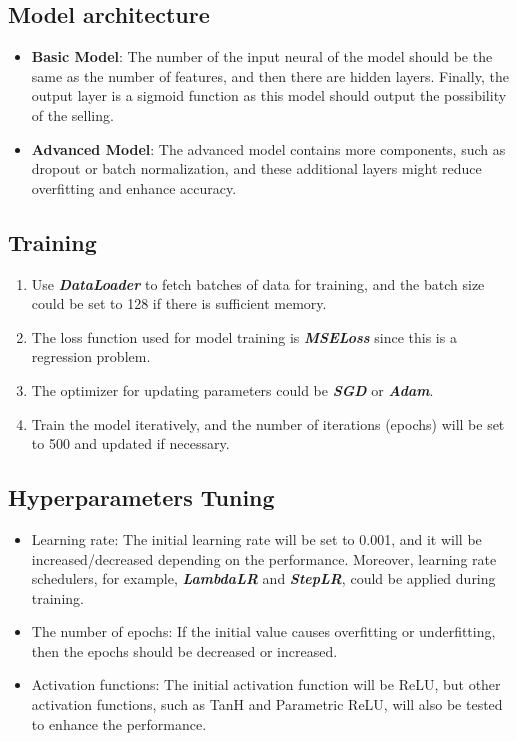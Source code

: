 \documentclass[12pt,twoside]{report}
\begin{document}
\subsection{Model architecture}
\begin{itemize}
	\item \textbf{Basic Model}: The number of the input neural of the model should be the same as the number of features, and then there are hidden layers. Finally, the output layer is a sigmoid function as this model should output the possibility of the selling. 
	\item \textbf{Advanced Model}: The advanced model contains more components, such as dropout or batch normalization, and these additional layers might reduce overfitting and enhance accuracy. 
\end{itemize}

\subsection{Training}
\begin{enumerate}
	\item Use \textbf{\textit{DataLoader}} to fetch batches of data for training, and the batch  size could be set to 128 if there is sufficient memory. 
	\item The loss function used for model training is \textbf{\textit{MSELoss}} since this is a regression problem. 
	\item The optimizer for updating parameters could be \textbf{\textit{SGD}} or \textbf{\textit{Adam}}.
	\item Train the model iteratively, and the number of iterations (epochs) will be set to 500 and updated if necessary. 
\end{enumerate}

\subsection{Hyperparameters Tuning}
\begin{itemize}
	\item Learning rate: The initial learning rate will be set to 0.001, and it will be increased/decreased depending on the performance. Moreover, learning rate schedulers, for example, \textbf{\textit{LambdaLR}} and \textbf{\textit{StepLR}}, could be applied during training. 
	\item The number of epochs: If the initial value causes overfitting or underfitting, then the epochs should be decreased or increased. 
	\item Activation functions: The initial activation function will be ReLU, but other activation functions, such as TanH and Parametric ReLU, will also be tested to enhance the performance. 
\end{itemize}
\end{document}
